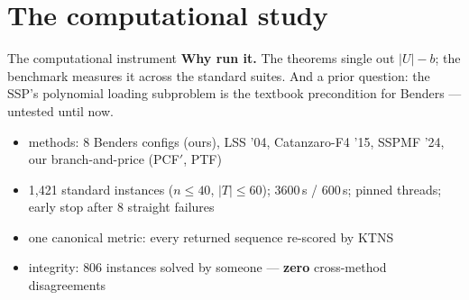 \documentclass[10pt]{beamer}
\newcommand{\U}{U}\newcommand{\Kst}{K^{\ast}}\newcommand{\Zst}{Z^{\ast}}
\begin{document}
\section{The computational study}
\begin{frame}{The computational instrument}
\textbf{Why run it.} The theorems single out $|\U|-b$; the benchmark measures
it across the standard suites. And a prior question: the SSP's polynomial
loading subproblem is the textbook precondition for Benders --- untested until
now.
\vspace{1mm}
\begin{itemize}
  \item methods: 8 Benders configs (ours), LSS '04, Catanzaro-F4 '15,
        SSPMF '24, our branch-and-price (PCF$'$, PTF)
  \item 1{,}421 standard instances ($n\le40$, $|T|\le60$); 3600\,s / 600\,s;
        pinned threads; early stop after 8 straight failures
  \item one canonical metric: every returned sequence re-scored by KTNS
  \item integrity: $806$ instances solved by someone --- \textbf{zero}
        cross-method disagreements
\end{itemize}
\end{frame}
\end{document}
